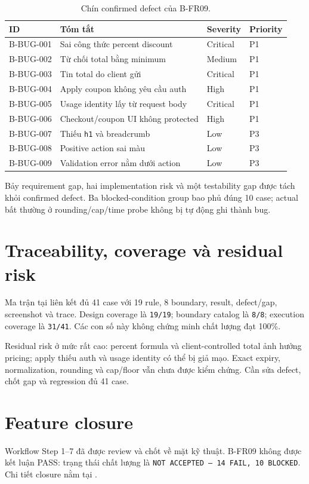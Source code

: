 \begin{table}[H]
  \centering
  \small
  \begin{tabular}{p{}p{}p{}p{}}
    \toprule
    ID & Tóm tắt & Severity & Priority \\
    \midrule
    B-BUG-001 & Sai công thức percent discount & Critical & P1 \\
    B-BUG-002 & Từ chối total bằng minimum & Medium & P1 \\
    B-BUG-003 & Tin total do client gửi & Critical & P1 \\
    B-BUG-004 & Apply coupon không yêu cầu auth & High & P1 \\
    B-BUG-005 & Usage identity lấy từ request body & Critical & P1 \\
    B-BUG-006 & Checkout/coupon UI không protected & High & P1 \\
    B-BUG-007 & Thiếu \texttt{h1} và breadcrumb & Low & P3 \\
    B-BUG-008 & Positive action sai màu & Low & P3 \\
    B-BUG-009 & Validation error nằm dưới action & Low & P3 \\
    \bottomrule
  \end{tabular}
  \caption{Chín confirmed defect của B-FR09.}
\end{table}

Bảy requirement gap, hai implementation risk và một testability gap được tách
khỏi confirmed defect. Ba blocked-condition group bao phủ đúng 10 case; actual
bất thường ở rounding/cap/time probe không bị tự động ghi thành bug.

\section{Traceability, coverage và residual risk}

Ma trận tại  liên kết đủ 41 case với
19 rule, 8 boundary, result, defect/gap, screenshot và trace. Design coverage là
\texttt{19/19}; boundary catalog là \texttt{8/8}; execution coverage là
\texttt{31/41}. Các con số này không chứng minh chất lượng đạt 100\%.

Residual risk ở mức rất cao: percent formula và client-controlled total ảnh
hưởng pricing; apply thiếu auth và usage identity có thể bị giả mạo. Exact expiry,
normalization, rounding và cap/floor vẫn chưa được kiểm chứng. Cần sửa defect,
chốt gap và regression đủ 41 case.

\section{Feature closure}

Workflow Step 1--7 đã được review và chốt về mặt kỹ thuật. B-FR09 không được
kết luận PASS: trạng thái chất lượng là
\texttt{NOT ACCEPTED --- 14 FAIL, 10 BLOCKED}. Chi tiết closure nằm
tại .

